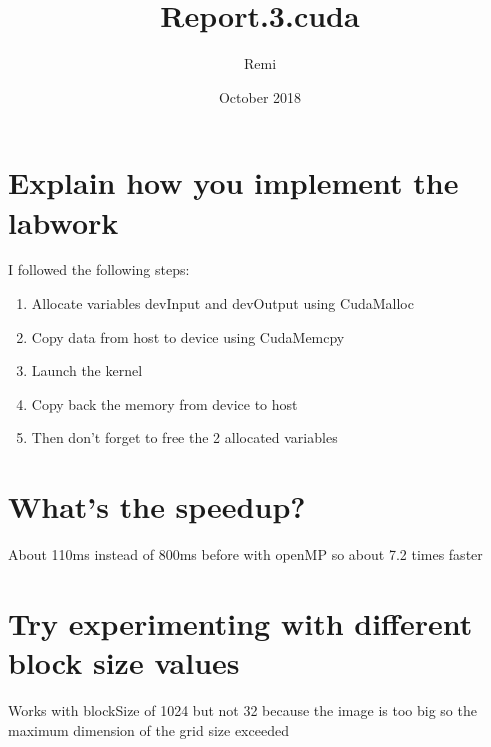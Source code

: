 \documentclass{article}
\title{Report.3.cuda}
\author{Remi}
\date{October 2018}
\begin{document}
\maketitle

\section{Explain how you implement the labwork}

I followed the following steps:
\begin{enumerate}  
\item Allocate variables devInput and devOutput using CudaMalloc
\item Copy data from host to device using CudaMemcpy
\item Launch the kernel
\item Copy back the memory from device to host
\item Then don't forget to free the 2 allocated variables
\end{enumerate}

\section{What’s the speedup?}

About 110ms instead of 800ms before with openMP so about 7.2 times faster

\section{Try experimenting with different block size values}

Works with blockSize of 1024 but not 32 because the image is too big so the maximum dimension of the grid size exceeded 
\end{document}
